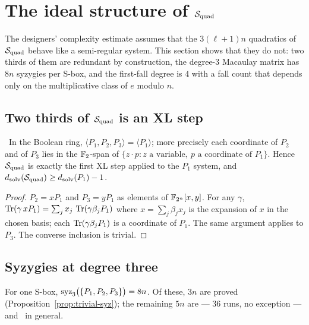 \section{The ideal structure of \texorpdfstring{$\mathcal{S}_{\mathrm{quad}}$}{Squad}}\label{sec:ideal}

The designers' complexity estimate assumes that the $3(\ell+1)n$ quadratics of $\mathcal{S}_{\mathrm{quad}}$ behave like a
semi-regular system. This section shows that they do not: two thirds of them are redundant by
construction, the degree-3 Macaulay matrix has $8n$ syzygies per S-box, and the first-fall degree is
$4$ with a fall count that depends only on the multiplicative class of $e$ modulo $n$.

\subsection{Two thirds of \texorpdfstring{$\mathcal{S}_{\mathrm{quad}}$}{Squad} is an XL step}

\begin{proposition}\label{prop:ideal-P1}
\Proved\ In the Boolean ring, $\langle P_1,P_2,P_3\rangle=\langle P_1\rangle$; more precisely each
coordinate of $P_2$ and of $P_3$ lies in the $\mathbb{F}_2$-span of $\{z\cdot p : z \text{ a variable},\ p
\text{ a coordinate of } P_1\}$. Hence $\mathcal{S}_{\mathrm{quad}}$ is exactly the first XL step applied to the $P_1$
system, and $d_{\mathrm{solv}}(\mathcal{S}_{\mathrm{quad}})\ge d_{\mathrm{solv}}(P_1)-1$.
\end{proposition}
\begin{proof}
$P_2=xP_1$ and $P_3=yP_1$ as elements of $\mathbb{F}_{2^n}[x,y]$. For any $\gamma$,
$\operatorname{Tr}(\gamma\, xP_1)=\sum_j x_j\,\operatorname{Tr}(\gamma\beta_j P_1)$ where $x=\sum_j \beta_j x_j$ is the expansion
of $x$ in the chosen basis; each $\operatorname{Tr}(\gamma\beta_j P_1)$ is a coordinate of $P_1$. The same argument
applies to $P_3$. The converse inclusion is trivial.
\end{proof}

\subsection{Syzygies at degree three}

\begin{theorem}[$8n$ syzygies]\label{thm:syz}
For one S-box, $\operatorname{syz}_3\bigl(\{P_1,P_2,P_3\}\bigr)=8n$. Of these, $3n$ are proved
(Proposition~\ref{prop:trivial-syz}); the remaining $5n$ are  --- $36$ runs, no exception --- and \Conj\ in general.
\end{theorem}

